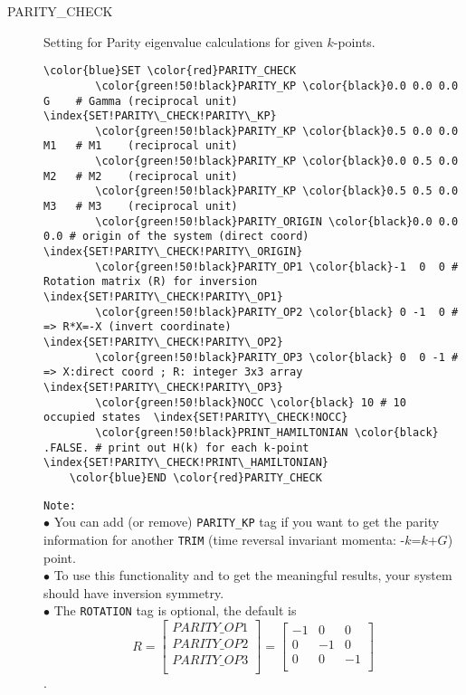 \documentclass[a4paper,12pt]{scrartcl}
\makeatletter
\def\namedlabel#1#2{\begingroup
    #2%
    \def\@currentlabel{#2}%
    \phantomsection\label{#1}\endgroup
}
\makeatother
\begin{document}
\begin{description}
    \item[\namedlabel{tag:PARITY}{PARITY\_CHECK}] 
		Setting for Parity eigenvalue calculations for given $k$-points.
 \begin{Verbatim}[commandchars=\\\{\},gobble=4, frame=single, framesep=2mm, 
	label= Parity check setup,
	labelposition=bottomline]
    \color{blue}SET \color{red}PARITY_CHECK
        \color{green!50!black}PARITY_KP \color{black}0.0 0.0 0.0  G    # Gamma (reciprocal unit)  \index{SET!PARITY\_CHECK!PARITY\_KP}
        \color{green!50!black}PARITY_KP \color{black}0.5 0.0 0.0  M1   # M1    (reciprocal unit)
        \color{green!50!black}PARITY_KP \color{black}0.0 0.5 0.0  M2   # M2    (reciprocal unit)
        \color{green!50!black}PARITY_KP \color{black}0.5 0.5 0.0  M3   # M3    (reciprocal unit)
        \color{green!50!black}PARITY_ORIGIN \color{black}0.0 0.0 0.0 # origin of the system (direct coord)  \index{SET!PARITY\_CHECK!PARITY\_ORIGIN}
        \color{green!50!black}PARITY_OP1 \color{black}-1  0  0 # Rotation matrix (R) for inversion  \index{SET!PARITY\_CHECK!PARITY\_OP1}
        \color{green!50!black}PARITY_OP2 \color{black} 0 -1  0 # => R*X=-X (invert coordinate)  \index{SET!PARITY\_CHECK!PARITY\_OP2}
        \color{green!50!black}PARITY_OP3 \color{black} 0  0 -1 # => X:direct coord ; R: integer 3x3 array  \index{SET!PARITY\_CHECK!PARITY\_OP3}
        \color{green!50!black}NOCC \color{black} 10 # 10 occupied states  \index{SET!PARITY\_CHECK!NOCC}
        \color{green!50!black}PRINT_HAMILTONIAN \color{black} .FALSE. # print out H(k) for each k-point  \index{SET!PARITY\_CHECK!PRINT\_HAMILTONIAN}             
    \color{blue}END \color{red}PARITY_CHECK
 \end{Verbatim}
 \texttt{Note:} \\
 $\bullet$ You can add (or remove) \texttt{PARITY\_KP} tag if you want to get the parity information for another \texttt{TRIM} (time reversal invariant momenta: -$k$=$k$+$G$) point. \\
 $\bullet$ To use this functionality and to get the meaningful results, your system should have inversion symmetry. \\
 $\bullet$ The \texttt{ROTATION} tag is optional, the default is
 \[
  R=
  \left[ {\begin{array}{c}
   PARITY\_OP1\\
   PARITY\_OP2\\
   PARITY\_OP3\\
  \end{array} }\right]
  =
  \left[ {\begin{array}{ccc}
   -1 & 0 & 0\\
   0 & -1 & 0\\
   0 & 0 & -1\\
  \end{array} } \right]
\].



\end{description}
\end{document}
